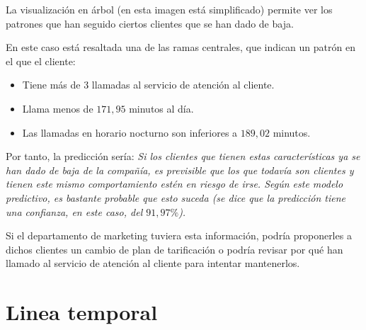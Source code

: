 \documentclass[a4paper, 11pt]{article} %
\begin{document}
\begin{shaded}
La visualización en árbol (en esta imagen está simplificado) permite ver los patrones que han seguido ciertos clientes que se han dado de baja.

En este caso está resaltada una de las ramas centrales, que indican un patrón en el que el cliente:
\begin{itemize}
    \item Tiene más de $3$ llamadas al servicio de atención al cliente.
    \item Llama menos de $171,95$ minutos al día.
    \item Las llamadas en horario nocturno son inferiores a $189,02$ minutos.
\end{itemize}

Por tanto, la predicción sería: \textit{Si los clientes que tienen estas características ya se han dado de baja de la compañía, es previsible que los que todavía son clientes y tienen este mismo comportamiento estén en riesgo de irse. Según este modelo predictivo, es bastante probable que esto suceda (se dice que la predicción tiene una confianza, en este caso, del $91,97\%$).}

Si el departamento de marketing tuviera esta información, podría proponerles a dichos clientes un cambio de plan de tarificación o podría revisar por qué han llamado al servicio de atención al cliente para intentar mantenerlos.
\end{shaded}
\section{Linea temporal}

\newpage
\end{document}
